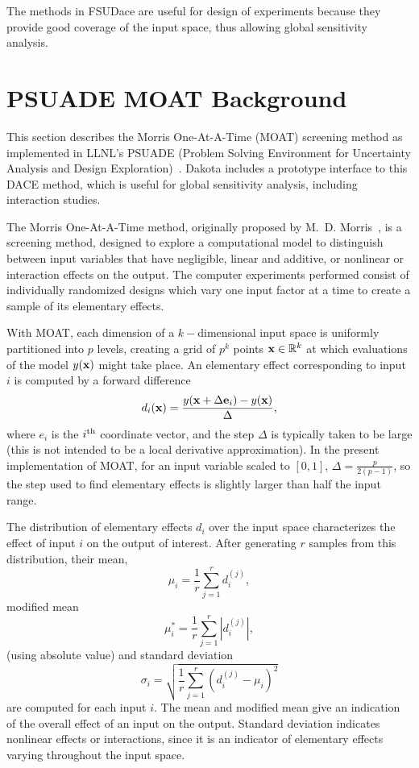 The methods in FSUDace are useful for design of experiments because 
they provide good coverage of the input space, thus allowing global 
sensitivity analysis.  

\section{PSUADE MOAT Background}\label{dace:psuade}

This section describes the Morris One-At-A-Time (MOAT) screening
method as implemented in LLNL's PSUADE (Problem Solving Environment
for Uncertainty Analysis and Design Exploration)~\cite{Ton05}.  Dakota
includes a prototype interface to this DACE method, which is useful
for global sensitivity analysis, including interaction studies. 

The Morris One-At-A-Time method, originally proposed by
M.~D. Morris~\cite{Mor91}, is a screening method, designed to explore
a computational model to distinguish between input variables that have
negligible, linear and additive, or nonlinear or interaction effects
on the output.  The computer experiments performed consist of
individually randomized designs which vary one input factor at a time
to create a sample of its elementary effects.

With MOAT, each dimension of a $k-$dimensional input space is
uniformly partitioned into $p$ levels, creating a grid of $p^k$ points
${\bf x} \in \mathbb{R}^k$ at which evaluations of the model $y({\bf
x})$ might take place.  An elementary effect corresponding to input
$i$ is computed by a forward difference
\begin{equation}
d_i({\bf x}) = \frac{y({\bf x} + \Delta {\bf e}_i) - y({\bf x})}{\Delta},
\end{equation}
where $e_i$ is the $i^{\mbox{\scriptsize th}}$ coordinate vector, and
the step $\Delta$ is typically taken to be large (this is not intended
to be a local derivative approximation).  In the present
implementation of MOAT, for an input variable scaled to $[0,1]$,
$\Delta = \frac{p}{2(p-1)}$, so the step used to find elementary
effects is slightly larger than half the input range.

The distribution of elementary effects $d_i$ over the input space
characterizes the effect of input $i$ on the output of interest.
After generating $r$ samples from this distribution, their mean,
\begin{equation}
\mu_i = \frac{1}{r}\sum_{j=1}^{r}{d_i^{(j)}},
\end{equation}
modified mean
\begin{equation}
\mu_i^* = \frac{1}{r}\sum_{j=1}^{r}{|d_i^{(j)}|},
\end{equation}
(using absolute value) and standard deviation
\begin{equation}
\sigma_i = \sqrt{ \frac{1}{r}\sum_{j=1}^{r}{ \left(d_i^{(j)} - \mu_i
\right)^2} }
\end{equation}
are computed for each input $i$.  The mean and modified mean give an
indication of the overall effect of an input on the output.  Standard
deviation indicates nonlinear effects or interactions, since it is an
indicator of elementary effects varying throughout the input space.

